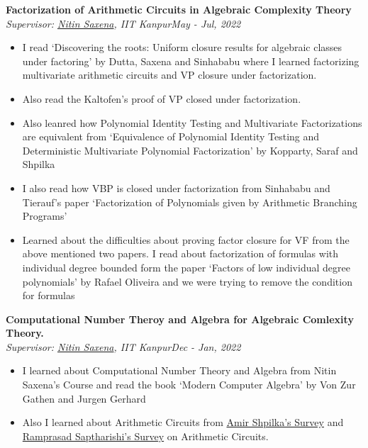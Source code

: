 \documentclass[letterpaper,10pt]{article}
\newcommand{\heading}[2]{
  \hspace{0pt}#1\hfill#2\\
}
\newcommand{\headingBf}[2]{
  \heading{\textbf{#1}}{\textbf{#2}}
}
\newcommand{\headingIt}[2]{
  \heading{\textit{#1}}{\textit{#2}}
}
\newenvironment{resume_list}{
  \vspace{-7pt}
  \begin{itemize}[itemsep=-2px, parsep=1pt, leftmargin=30pt, label={$\circ$}]
}{
  \end{itemize}
}
\begin{document}
\begin{resume_list}
\item \headingBf{Factorization of Arithmetic Circuits in Algebraic Complexity Theory}{}
\headingIt{Supervisor: \href{https://www.cse.iitk.ac.in/users/nitin/}{Nitin Saxena}, IIT Kanpur}{May - Jul, 2022}
\begin{itemize}
	\item I read `Discovering the roots: Uniform closure results for algebraic classes under factoring' by Dutta, Saxena and Sinhababu  where I learned factorizing multivariate arithmetic circuits and \textsc{VP} closure under factorization. 
	\item  Also read the Kaltofen's proof of \textsc{VP} closed under factorization.
	\item Also leanred how Polynomial Identity Testing and Multivariate Factorizations are equivalent from `Equivalence of Polynomial Identity Testing and Deterministic Multivariate Polynomial Factorization' by  Kopparty, Saraf and Shpilka
	\item I also read how \textsc{VBP} is closed under factorization from  Sinhababu and Tierauf's paper `Factorization of Polynomials given by Arithmetic Branching Programs'
	\item Learned about the difficulties about proving factor closure for \textsc{VF} from the above mentioned two papers. I read about factorization of formulas with individual degree bounded form the paper `Factors of low individual degree polynomials' by Rafael Oliveira and we were trying to remove the condition for formulas
\end{itemize}


\item \headingBf{Computational Number Theroy and Algebra for Algebraic Comlexity Theory.}{}
\headingIt{Supervisor: \href{https://www.cse.iitk.ac.in/users/nitin/}{Nitin Saxena}, IIT Kanpur}{Dec - Jan, 2022}
\begin{itemize}
	\item I learned about Computational Number Theory and Algebra from Nitin Saxena's Course and read the book `Modern Computer Algebra' by Von Zur Gathen and Jurgen Gerhard
	\item Also I learned about Arithmetic Circuits from \href{https://www.nowpublishers.com/article/Details/TCS-039}{Amir Shpilka's Survey} and 
	\href{https://github.com/dasarpmar/lowerbounds-survey}{Ramprasad Saptharishi's Survey} on Arithmetic Circuits.
\end{itemize}
\end{resume_list}
\end{document}
